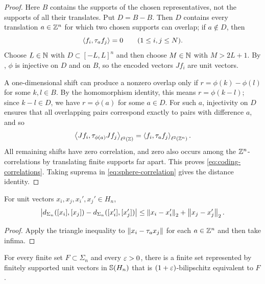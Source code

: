\begin{proof}
Here $B$ contains the supports of the chosen representatives, not the supports
of all their translates.  Put $D=B-B$.  Then $D$ contains every translation
$a\in\mathbb Z^n$ for which two chosen supports can overlap; if $a\notin D$, then
\[
        \left\langle f_i,\tau_a f_j\right\rangle=0
        \qquad(1\le i,j\le N).
\]
Choose $L\in\mathbb N$ with $D\subset[-L,L]^n$ and then choose $M\in\mathbb N$ with
$M>2L+1$.  By , $\phi$ is injective on $D$ and
on $B$, so the encoded vectors $Jf_i$ are unit vectors.

A one-dimensional shift can produce a nonzero overlap only if
$r=\phi(k)-\phi(l)$ for some $k,l\in B$.  By the homomorphism identity, this
means $r=\phi(k-l)$; since $k-l\in D$, we have $r=\phi(a)$ for some $a\in D$.
For such $a$, injectivity on $D$ ensures that all overlapping pairs correspond
exactly to pairs with difference $a$, and so
\[
        \left\langle Jf_i,\tau_{\phi(a)}Jf_j\right\rangle_{\ell^2(\mathbb Z)}
        =
        \left\langle f_i,\tau_a f_j\right\rangle_{\ell^2(\mathbb Z^n)}.
\]
All remaining shifts have zero correlation, and zero also occurs among the
$\mathbb Z^n$-correlations by translating finite supports far apart.  This proves
\eqref{eq:coding-correlations}.  Taking suprema in \eqref{eq:sphere-correlation}
gives the distance identity.
\end{proof}

\begin{lemma}
\label{lem:quotient-lipschitz-representatives}
\leanok
{}
For unit vectors $x_i,x_j,x_i',x_j'\in H_n$,
\begin{equation}\label{eq:quotient-lipschitz-representatives}
        \left|d_{\Sigma_n}([x_i],[x_j])-d_{\Sigma_n}([x_i'],[x_j'])\right|
        \le \left\lVert x_i-x_i'\right\rVert_2+\left\lVert x_j-x_j'\right\rVert_2 .
\end{equation}
\end{lemma}

\begin{proof}
Apply the triangle inequality to $\left\lVert x_i-\tau_a x_j\right\rVert$ for each $a\in\mathbb Z^n$
and then take infima.
\end{proof}

\begin{lemma}
\label{lem:finite-support-approximation}
\leanok
{}
For every finite set $F\subset\Sigma_n$ and every $\varepsilon>0$, there is a finite
set represented by finitely supported unit vectors in $\mathbb S(H_n)$ that is
$(1+\varepsilon)$-bilipschitz equivalent to $F$.
\end{lemma}

